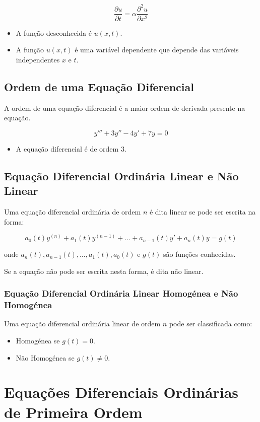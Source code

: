 \documentclass{article}
\begin{document}
$$
\frac{\partial u}{\partial t} = \alpha \frac{\partial^2 u}{\partial x^2}
$$

\begin{itemize}
    \item A função desconhecida é $u(x,t)$.
    \item A função $u(x,t)$ é uma variável dependente que depende das variáveis independentes $x$ e $t$.
\end{itemize}

\subsection{Ordem de uma Equação Diferencial}
A ordem de uma equação diferencial é a maior ordem de derivada presente na equação.

$$
y''' + 3y'' - 4y' + 7y = 0
$$

\begin{itemize}
    \item A equação diferencial é de ordem 3.
\end{itemize}

\subsection{Equação Diferencial Ordinária Linear e Não Linear}
Uma equação diferencial ordinária de ordem $n$ é dita linear se pode ser escrita na forma:

$$
a_0(t) y^{(n)} + a_1(t) y^{(n-1)} + \ldots + a_{n-1}(t) y' + a_n(t) y = g(t)
$$

onde $a_n(t), a_{n-1}(t), \ldots, a_1(t), a_0(t)$ e $g(t)$ são funções conhecidas.\par
\bigskip
Se a equação não pode ser escrita nesta forma, é dita não linear.

\subsubsection{Equação Diferencial Ordinária Linear Homogénea e Não Homogénea}
Uma equação diferencial ordinária linear de ordem $n$ pode ser classificada como:

\begin{itemize}
    \item Homogénea se $g(t) = 0$.
    \item Não Homogénea se $g(t) \neq 0$.
\end{itemize}


\newpage


\section{Equações Diferenciais Ordinárias de Primeira Ordem}
\end{document}
